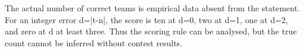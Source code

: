 The actual number of correct teams is empirical data absent from the statement. For an integer error d=|t-n|, the score is ten at d=0, two at d=1, one at d=2, and zero at d at least three. Thus the scoring rule can be analysed, but the true count cannot be inferred without contest results.
